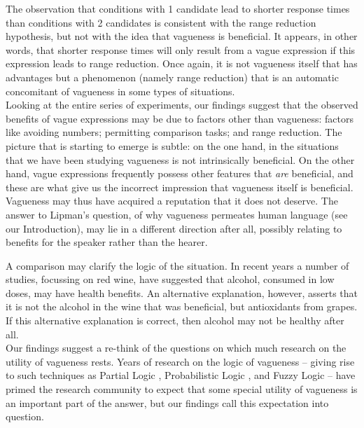 The observation that conditions with 1 candidate lead to shorter response times than conditions with 2 candidates is consistent with the range reduction hypothesis, but not with the idea that vagueness is beneficial. It appears, in other words, that shorter response times will only result from a vague expression if this expression leads to range reduction. Once again, it is not vagueness itself that has advantages but a phenomenon (namely range reduction) that is an automatic concomitant of vagueness in some types of situations.\\[2ex]
%
\noindent Looking at the entire series of experiments, our findings suggest that the observed benefits of vague expressions may be due to factors other than vagueness: factors like avoiding numbers; permitting comparison tasks; and range reduction. The picture that is starting to emerge is subtle: on the one hand, in the situations that we have been studying vagueness is not intrinsically beneficial. On the other hand, vague expressions frequently possess other features that \emph{are} beneficial, and these are what give us the incorrect impression that vagueness itself is beneficial. Vagueness may thus have acquired a reputation that it does not deserve. The answer to Lipman's question, of why vagueness permeates human language (see our Introduction), may lie in a different direction after all, possibly relating to benefits for the speaker rather than the hearer.

A comparison may clarify the logic of the situation. In recent years a number of studies, focussing on red wine, have suggested that alcohol, consumed in low doses, may have health benefits. An alternative explanation, however, asserts that it is not the alcohol in the wine that was beneficial, but antioxidants from grapes. If this alternative explanation is correct, then alcohol may not be healthy after all.\\[2ex]
%
Our findings suggest a re-think of the questions on which much research on the utility of vagueness rests. Years of research on the logic of vagueness -- giving rise to such techniques as Partial Logic \citep[e.g.,][]{Fine}, Probabilistic Logic \citep{Edgington}, and Fuzzy Logic \citep{Zadeh} -- have primed the research community to expect that some special utility of vagueness is an important part of the answer, but our findings call this expectation into question. 

